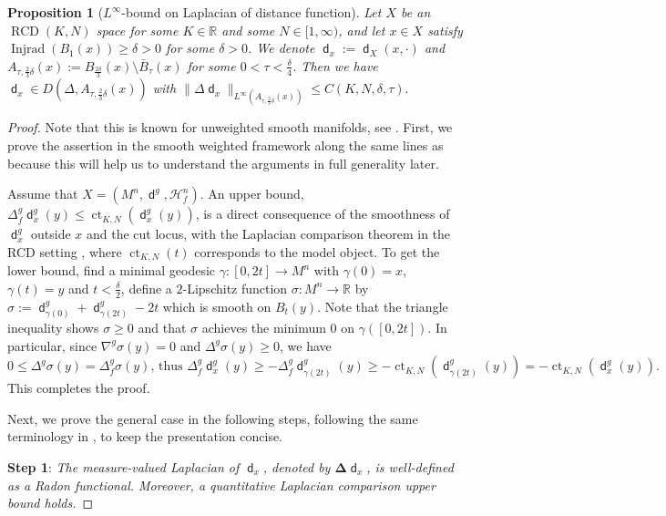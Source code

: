 \documentclass[11pt,reqno]{amsart}
\newtheorem{proposition}[theorem]{Proposition}
\theoremstyle{definition}
\numberwithin{equation}{section}
\DeclareMathOperator{\ct}{ct}
\DeclareMathOperator{\dist}{\mathsf{d}}
\DeclareMathOperator{\Injrad}{Injrad}
\DeclareMathOperator{\RCD}{RCD}
\newcommand{\haus}{\mathscr{H}}
\begin{document}
\begin{proposition}[$L^{\infty}$-bound on Laplacian of distance function]\label{prop:injec}
Let $X$ be an $\RCD(K, N)$ space for some $K \in \mathbb{R}$ and some $N \in [1, \infty)$, and let $x \in X$ satisfy
$
\Injrad (B_{1}(x))\ge \delta>0
$
for some $\delta>0$.
We denote $\dist_x := \dist_X(x, \cdot)$ and $A_{\tau, \frac{2}{3}\delta} (x) := B_{\frac{2\delta}{3}}(x) \setminus \bar B_{\tau}(x)$ for some $0<\tau<\frac{\delta}{4}$. Then we have  $\dist_x \in D(\Delta, A_{\tau, \frac{2}{3}\delta} (x))$ with 
$
\| \Delta \dist_x \|_{L^{\infty}(A_{\tau, \frac{2}{3}\delta} (x))} \le C(K, N, \delta, \tau).
$
\end{proposition}
\begin{proof}
Note that this is known for unweighted smooth manifolds, see \cite[Lemma 1.4]{AC}. First, 
we prove the assertion in the smooth weighted framework along the same lines as \cite{AC} because this will help us to understand the arguments in full generality later.  

Assume that $X=(M^n, \dist^g, \haus^n_f)$.
An upper bound,
$\Delta^g_f\dist_x^g(y) \le \ct_{K, N}(\dist_x^g(y))$, 
is a direct consequence of the smoothness of $\dist_x^g$ outside $x$ and the cut locus, with the Laplacian comparison theorem in the RCD setting \cite{Gigli}, where $\ct _{K, N}(t)$ corresponds to the model object.
To get the lower bound, find a minimal geodesic $\gamma:[0, 2t] \to M^n$ with $\gamma(0)=x$, $\gamma(t)=y$ and $t<\frac{\delta}{2}$, define a $2$-Lipschitz function $\sigma:M^n \to \mathbb{R}$ by 
$
\sigma:=\dist_{\gamma(0)}^g+\dist^g_{\gamma(2t)}-2t
$
which is smooth on $B_t(y)$. Note that the triangle inequality shows $\sigma \ge 0$ and that $\sigma$ achieves the minimum $0$ on $\gamma([0, 2t])$. In particular, since $\nabla^g \sigma (y)=0$ and $\Delta^g \sigma (y) \ge 0$, we have 
$$
0\le \Delta^g \sigma(y) = \Delta^g_f \sigma (y),\,\text{thus}\,\,\Delta^g_f\dist_x^g(y) \ge -\Delta^g_f\dist_{\gamma(2t)}^g(y) \ge - \ct _{K, N}(\dist_{\gamma(2t)}^g(y))=-\ct _{K, N}(\dist_x^g(y)).
$$
This completes the proof.


Next, we prove the general case in the following steps, following the same terminology in \cite{CM},  to keep the presentation concise. 

\smallskip 

\textbf{Step 1}: \textit{The measure-valued Laplacian of $\dist_x$, denoted by $\boldsymbol{\Delta} \dist_x$, is well-defined as a Radon functional. Moreover, a quantitative Laplacian comparison upper bound holds.}


\end{proof}
\end{document}
